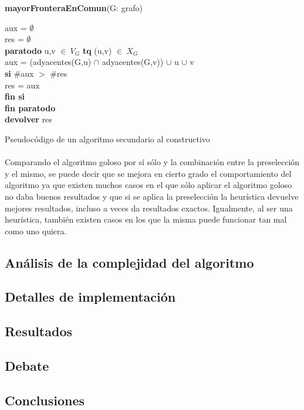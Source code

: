 \vspace{3em}

\textbf{mayorFronteraEnComun}(G: grafo) \\
\begin{algorithm}[H]
	\BlankLine
	aux = $\emptyset$\\
	res = $\emptyset$\\
	\textbf{paratodo} u,v $\in\ V_{G}$ \textbf{tq} (u,v) $\in\ X_{G}$ \\
		\tab aux = (adyacentes(G,u) $\cap$ adyacentes(G,v)) $\cup$ u $\cup$ v\\
		\tab \textbf{si} \#aux $>$ \#res\\
			\tab \tab res = aux\\
		\tab \textbf{fin si}\\
	\textbf{fin paratodo}\\

	\textbf{devolver} res

\caption{Pseudocódigo de un algoritmo secundario al constructivo}
\end{algorithm}
 
\normalsize

\paragraph{}
Comparando el algoritmo goloso por sí sólo y la combinación entre la preselección y el mismo, se puede decir que se mejora en cierto grado el comportamiento del algoritmo ya que existen muchos casos en el que sólo aplicar el algoritmo goloso no daba buenos resultados y que si se aplica la preselección la heurística devuelve mejores resultados, incluso a veces da resultados exactos. Igualmente, al ser una heurística, también existen casos en los que la misma puede funcionar tan mal como uno quiera.


\subsection{Análisis de la complejidad del algoritmo}
\subsection{Detalles de implementación}
\subsection{Resultados}
\subsection{Debate}
\subsection{Conclusiones}
